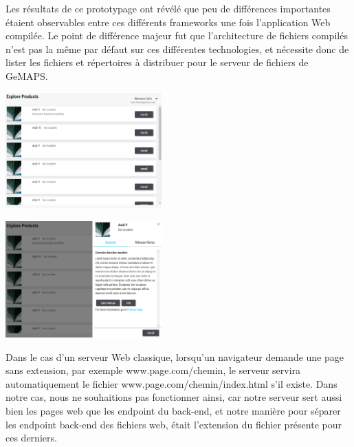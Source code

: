 \documentclass[francais]{rapportPFE}  %
\begin{document}
Les résultats de ce prototypage ont révélé que peu de différences importantes étaient observables entre ces différents frameworks une fois l'application Web compilée. Le point de différence majeur fut que l'architecture de fichiers compilés n'est pas la même par défaut sur ces différentes technologies, et nécessite donc de lister les fichiers et répertoires à distribuer pour le serveur de fichiers de GeMAPS.

\begin{center}
    \centering
    \begin{minipage}{.5\textwidth}
    \centering
    \includegraphics[width=6cm]{graphics/vue_demo.png}
    \label{fig:test1}
    \end{minipage}%
    \begin{minipage}{.5\textwidth}
    \centering
    \includegraphics[width=6cm]{graphics/vue_demo2.png}
    \label{fig:test2}
    \end{minipage}
    \end{center}

Dans le cas d'un serveur Web classique, lorsqu'un navigateur demande une page sans extension, par exemple www.page.com/chemin, le serveur servira automatiquement le fichier www.page.com/chemin/index.html s'il existe. Dans notre cas, nous ne souhaitions pas fonctionner ainsi, car notre serveur sert aussi bien les pages web que les endpoint du back-end, et notre manière pour séparer les endpoint back-end des fichiers web, était l'extension du fichier présente pour ces derniers. 
    
\end{document}
